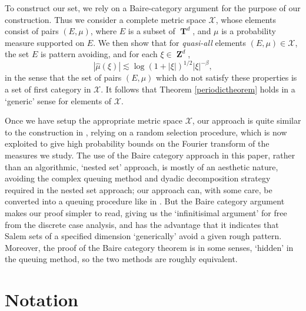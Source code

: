 \documentclass[12pt,reqno]{article}
\numberwithin{equation}{section}
\DeclareMathOperator{\ZZ}{\mathbf{Z}}
\DeclareMathOperator{\TT}{\mathbf{T}}
\begin{document}
To construct our set, we rely on a Baire-category argument for the purpose of our construction. Thus we consider a complete metric space $\mathcal{X}$, whose elements consist of pairs $(E,\mu)$, where $E$ is a subset of $\TT^d$, and $\mu$ is a probability measure supported on $E$. We then show that for \emph{quasi-all} elements $(E,\mu) \in \mathcal{X}$, the set $E$ is pattern avoiding, and for each $\xi \in \ZZ^d$,
%
\[ |\widehat{\mu}(\xi)| \lesssim \log(1 + |\xi|)^{1/2} |\xi|^{-\beta}, \]
%
in the sense that the set of pairs $(E,\mu)$ which do not satisfy these properties is a set of first category in $\mathcal{X}$. It follows that Theorem \ref{periodictheorem} holds in a `generic' sense for elements of $\mathcal{X}$.

Once we have setup the appropriate metric space $\mathcal{X}$, our approach is quite similar to the construction in \cite{OurPaper}, relying on a random selection procedure, which is now exploited to give high probability bounds on the Fourier transform of the measures we study. The use of the Baire category approach in this paper, rather than an algorithmic, `nested set' approach, is mostly of an aesthetic nature, avoiding the complex queuing method and dyadic decomposition strategy required in the nested set approach; our approach can, with some care, be converted into a queuing procedure like in \cite{OurPaper}. But the Baire category argument makes our proof simpler to read, giving us the `infinitisimal argument' for free from the discrete case analysis, and has the advantage that it indicates that Salem sets of a specified dimension `generically' avoid a given rough pattern. Moreover, the proof of the Baire category theorem is in some senses, `hidden' in the queuing method, so the two methods are roughly equivalent.

\section{Notation} \label{notationSection}
\end{document}
